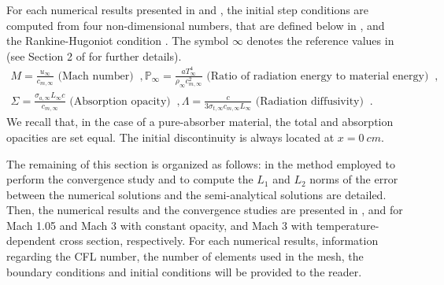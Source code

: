 \documentclass[times,doublespace]{fldauth}%
\begin{document}
For each numerical results presented in  and , the initial step conditions are computed from four non-dimensional numbers, that are defined below in , and the Rankine-Hugoniot condition \cite{toro, LowrieEdwards}. The symbol $\infty$ denotes the reference values in  (see Section 2 of \cite{LowrieEdwards} for further details).
%
\begin{eqnarray}\label{eq:scaled-nb}
M = \frac{u_\infty}{c_{m,\infty}} \text{ (Mach number) } \ , 
\mathbb{P}_\infty = \frac{a T^4_\infty}{\rho_\infty c^2_{m,\infty} } \text{ (Ratio of radiation energy to material energy) } \ , \nonumber \\
\mathbb{\Sigma} =  \frac{\sigma_{a, \infty} L_\infty c}{c_{m,\infty}} \text{ (Absorption opacity) } \ ,
\mathbb{\Lambda} = \frac{c}{3 \sigma_{t, \infty} c_{m,\infty} L_\infty} \text{ (Radiation diffusivity) } \ .
\end{eqnarray}
%
We recall that, in the case of a pure-absorber material, the total and absorption opacities are set equal. The initial discontinuity is always located at $x = 0 \ cm$. %

The remaining of this section is organized as follows: in  the method employed to perform the convergence study and to compute the $L_1$ and $L_2$ norms of the error between the numerical solutions and the semi-analytical solutions are detailed. Then, the numerical results and the convergence studies are presented in ,  and  for Mach 1.05 and Mach 3 with constant opacity, and Mach 3 with temperature-dependent cross section, respectively. For each numerical results, information regarding the CFL number, the number of elements used in the mesh, the boundary conditions and initial conditions will be provided to the reader.
%
\end{document}
